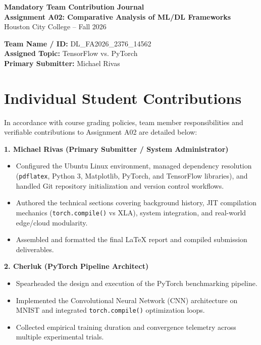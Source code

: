 \documentclass[11pt, a4paper]{article}
\begin{document}
\begin{center}
    {\LARGE \textbf{\color{textdark}Mandatory Team Contribution Journal}} \\[0.5em]
    {\large \color{accentcolor}\textbf{Assignment A02: Comparative Analysis of ML/DL Frameworks}} \\[0.3em]
    {\normalsize \color{textmuted}Houston City College -- Fall 2026}
\end{center}

\vspace{1em}

\noindent \textbf{Team Name / ID:} DL\_FA2026\_2376\_14562 \\
\textbf{Assigned Topic:} TensorFlow vs. PyTorch \\
\textbf{Primary Submitter:} Michael Rivas \\

\vspace{1em}
\section*{Individual Student Contributions}
In accordance with course grading policies, team member responsibilities and verifiable contributions to Assignment A02 are detailed below:

\vspace{0.5em}
\noindent \textbf{1. Michael Rivas (Primary Submitter / System Administrator)}
\begin{itemize}
    \item Configured the Ubuntu Linux environment, managed dependency resolution (\texttt{pdflatex}, Python 3, Matplotlib, PyTorch, and TensorFlow libraries), and handled Git repository initialization and version control workflows.
    \item Authored the technical sections covering background history, JIT compilation mechanics (\texttt{torch.compile()} vs XLA), system integration, and real-world edge/cloud modularity.
    \item Assembled and formatted the final LaTeX report and compiled submission deliverables.
\end{itemize}

\vspace{0.5em}
\noindent \textbf{2. Cherluk (PyTorch Pipeline Architect)}
\begin{itemize}
    \item Spearheaded the design and execution of the PyTorch benchmarking pipeline.
    \item Implemented the Convolutional Neural Network (CNN) architecture on MNIST and integrated \texttt{torch.compile()} optimization loops.
    \item Collected empirical training duration and convergence telemetry across multiple experimental trials.
\end{itemize}
\end{document}
